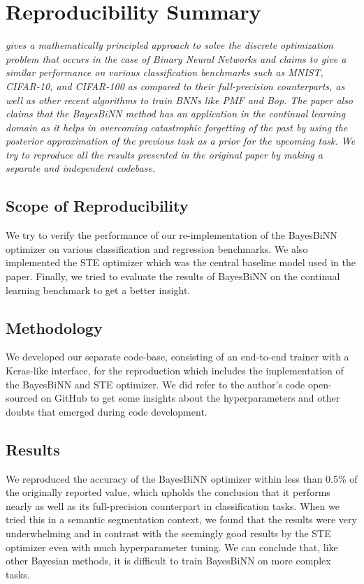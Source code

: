 \section*{\centering Reproducibility Summary}

\textit{\citet{r1} gives a mathematically principled approach to solve the discrete optimization problem that occurs in the case of Binary Neural Networks and claims to give a similar performance on various classification benchmarks such as MNIST, CIFAR-10, and CIFAR-100 as compared to their full-precision counterparts, as well as other recent algorithms to train BNNs like PMF and Bop. The paper also claims that the BayesBiNN method has an application in the continual learning domain as it helps in overcoming catastrophic forgetting of the past by using the posterior approximation of the previous task as a prior for the upcoming task. We try to reproduce all the results presented in the original paper by making a separate and independent codebase.
}

\subsection*{Scope of Reproducibility}

We try to verify the performance of our re-implementation of the BayesBiNN optimizer on various classification and regression benchmarks. We also implemented the STE optimizer which was the central baseline model used in the paper. Finally, we tried to evaluate the results of BayesBiNN on the continual learning benchmark to get a better insight.

\subsection*{Methodology}

We developed our separate code-base, consisting of an end-to-end trainer with a Keras-like interface, for the reproduction which includes the implementation of the BayesBiNN and STE optimizer. We did refer to the author's code open-sourced on GitHub to get some insights about the hyperparameters and other doubts that emerged during code development.

\subsection*{Results}

We reproduced the accuracy of the BayesBiNN optimizer within less than 0.5\% of the originally reported value, which upholds the conclusion that it performs nearly as well as its full-precision counterpart in classification tasks. When we tried this in a semantic segmentation context, we found that the results were very underwhelming and in contrast with the seemingly good results by the STE optimizer even with much hyperparameter tuning. We can conclude that, like other Bayesian methods, it is difficult to train BayesBiNN on more complex tasks.

